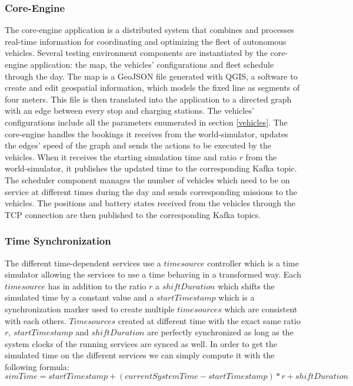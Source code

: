 \documentclass[12pt,a4paper]{article}
\begin{document}
\subsubsection{Core-Engine}
The core-engine application is a distributed system that combines and processes real-time information for coordinating and optimizing the fleet of autonomous vehicles. Several testing environment components are instantiated by the core-engine application: the map, the vehicles' configurations and fleet schedule through the day. The map is a GeoJSON file generated with QGIS, a software to create and edit geospatial information, which models the fixed line as segments of four meters. This file is then translated into the application to a directed graph with an edge between every stop and charging stations. The vehicles' configurations include all the parameters enumerated in section \ref{vehicles}. The core-engine handles the bookings it receives from the world-simulator, updates the edges' speed of the graph and sends the actions to be executed by the vehicles. When it receives the starting simulation time and ratio $r$ from the world-simulator, it publishes the updated time to the corresponding Kafka topic. The scheduler component manages the number of vehicles which need to be on service at different times during the day and sends corresponding missions to the vehicles. The positions and battery states received from the vehicles through the TCP connection are then published to the corresponding Kafka topics.  

\subsubsection{Time Synchronization}
The different time-dependent services use a $timesource$ controller which is a time simulator allowing the services to use a time behaving in a transformed way. Each $timesource$ has in addition to the ratio $r$ a $shift Duration$ which shifts the simulated time by a constant value and a $start Timestamp$ which is a  synchronization marker used to create multiple $timesources$ which are consistent with each others. $Timesources$ created at different time with the exact same ratio $r$, $start Timestamp$ and $shift Duration$ are perfectly synchronized as long as the system clocks of the running services are synced as well. In order to get the simulated time on the different services we can simply compute it with the following formula:
$$simTime = start Timestamp + (current System Time - start Timestamp) * r + shift Duration$$
\end{document}
